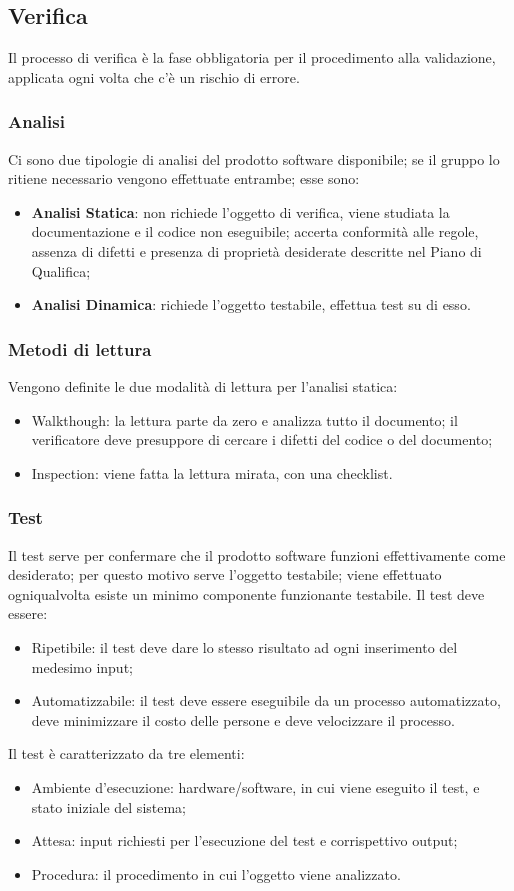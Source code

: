 \subsection{Verifica}
Il processo di verifica è la fase obbligatoria per il procedimento alla validazione, applicata ogni volta 
che c’è un rischio di errore.
\subsubsection{Analisi}
Ci sono due tipologie di analisi del prodotto software disponibile; se il gruppo lo ritiene necessario 
vengono effettuate entrambe; esse sono:
\begin{itemize}
\item \textbf{Analisi Statica}: non richiede l’oggetto di verifica, viene studiata la documentazione e il 
codice non eseguibile; accerta conformità alle regole, assenza di difetti e presenza di proprietà desiderate 
descritte nel Piano di Qualifica;
\item \textbf{Analisi Dinamica}: richiede l’oggetto testabile, effettua test su di esso.
\end{itemize}

\subsubsection{Metodi di lettura}
Vengono definite le due modalità di lettura per l’analisi statica:
\begin{itemize}
\item Walkthough: la lettura parte da zero e analizza tutto il documento; il verificatore deve 
presuppore di cercare i difetti del codice o del documento;
\item Inspection: viene fatta la lettura mirata, con una checklist.
\end{itemize}

\subsubsection{Test}
Il test serve per confermare che il prodotto software funzioni effettivamente come desiderato; per questo 
motivo serve l’oggetto testabile; viene effettuato ogniqualvolta esiste un minimo componente funzionante 
testabile. Il test deve essere: 
\begin{itemize}
\item Ripetibile: il test deve dare lo stesso risultato ad ogni inserimento del medesimo input;
\item Automatizzabile: il test deve essere eseguibile da un processo automatizzato, deve minimizzare il costo 
delle persone e deve velocizzare il processo.
\end{itemize}
Il test è caratterizzato da tre elementi:
\begin{itemize}
\item Ambiente d’esecuzione: hardware/software, in cui viene eseguito il test, e stato iniziale del sistema;
\item Attesa: input richiesti per l’esecuzione del test e corrispettivo output;
\item Procedura: il procedimento in cui l’oggetto viene analizzato.
\end{itemize}

